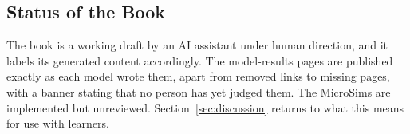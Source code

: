 \subsection{Status of the Book}

The book is a working draft by an AI assistant under human direction, and it labels its generated content accordingly. The model-results pages are published exactly as each model wrote them, apart from removed links to missing pages, with a banner stating that no person has yet judged them. The MicroSims are implemented but unreviewed. Section~\ref{sec:discussion} returns to what this means for use with learners.
